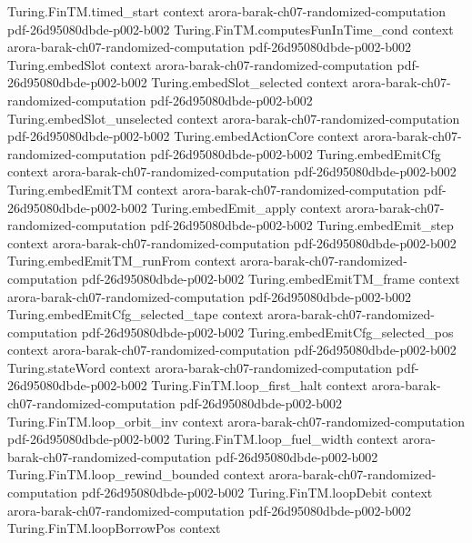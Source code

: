\begin{theorem}
\proofstep
  {Turing.FinTM.timed_start}
  {context}
  {arora-barak-ch07-randomized-computation}
  {pdf-26d95080dbde-p002-b002}
\proofstep
  {Turing.FinTM.computesFunInTime_cond}
  {context}
  {arora-barak-ch07-randomized-computation}
  {pdf-26d95080dbde-p002-b002}
\proofstep
  {Turing.embedSlot}
  {context}
  {arora-barak-ch07-randomized-computation}
  {pdf-26d95080dbde-p002-b002}
\proofstep
  {Turing.embedSlot_selected}
  {context}
  {arora-barak-ch07-randomized-computation}
  {pdf-26d95080dbde-p002-b002}
\proofstep
  {Turing.embedSlot_unselected}
  {context}
  {arora-barak-ch07-randomized-computation}
  {pdf-26d95080dbde-p002-b002}
\proofstep
  {Turing.embedActionCore}
  {context}
  {arora-barak-ch07-randomized-computation}
  {pdf-26d95080dbde-p002-b002}
\proofstep
  {Turing.embedEmitCfg}
  {context}
  {arora-barak-ch07-randomized-computation}
  {pdf-26d95080dbde-p002-b002}
\proofstep
  {Turing.embedEmitTM}
  {context}
  {arora-barak-ch07-randomized-computation}
  {pdf-26d95080dbde-p002-b002}
\proofstep
  {Turing.embedEmit_apply}
  {context}
  {arora-barak-ch07-randomized-computation}
  {pdf-26d95080dbde-p002-b002}
\proofstep
  {Turing.embedEmit_step}
  {context}
  {arora-barak-ch07-randomized-computation}
  {pdf-26d95080dbde-p002-b002}
\proofstep
  {Turing.embedEmitTM_runFrom}
  {context}
  {arora-barak-ch07-randomized-computation}
  {pdf-26d95080dbde-p002-b002}
\proofstep
  {Turing.embedEmitTM_frame}
  {context}
  {arora-barak-ch07-randomized-computation}
  {pdf-26d95080dbde-p002-b002}
\proofstep
  {Turing.embedEmitCfg_selected_tape}
  {context}
  {arora-barak-ch07-randomized-computation}
  {pdf-26d95080dbde-p002-b002}
\proofstep
  {Turing.embedEmitCfg_selected_pos}
  {context}
  {arora-barak-ch07-randomized-computation}
  {pdf-26d95080dbde-p002-b002}
\proofstep
  {Turing.stateWord}
  {context}
  {arora-barak-ch07-randomized-computation}
  {pdf-26d95080dbde-p002-b002}
\proofstep
  {Turing.FinTM.loop_first_halt}
  {context}
  {arora-barak-ch07-randomized-computation}
  {pdf-26d95080dbde-p002-b002}
\proofstep
  {Turing.FinTM.loop_orbit_inv}
  {context}
  {arora-barak-ch07-randomized-computation}
  {pdf-26d95080dbde-p002-b002}
\proofstep
  {Turing.FinTM.loop_fuel_width}
  {context}
  {arora-barak-ch07-randomized-computation}
  {pdf-26d95080dbde-p002-b002}
\proofstep
  {Turing.FinTM.loop_rewind_bounded}
  {context}
  {arora-barak-ch07-randomized-computation}
  {pdf-26d95080dbde-p002-b002}
\proofstep
  {Turing.FinTM.loopDebit}
  {context}
  {arora-barak-ch07-randomized-computation}
  {pdf-26d95080dbde-p002-b002}
\proofstep
  {Turing.FinTM.loopBorrowPos}
  {context}

\end{theorem}
